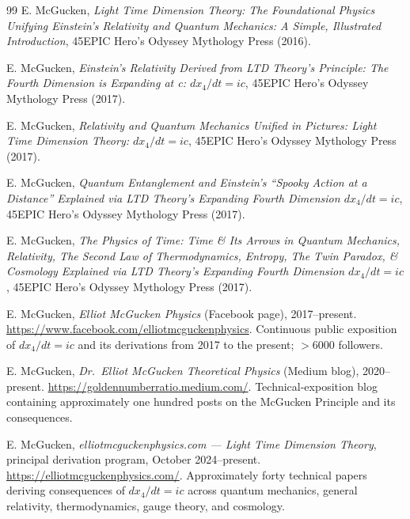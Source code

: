 \documentclass[11pt,a4paper]{article}
\begin{document}
\begin{thebibliography}{99}
 E. McGucken, \emph{Light Time Dimension Theory: The Foundational Physics Unifying Einstein's Relativity and Quantum Mechanics: A Simple, Illustrated Introduction}, 45EPIC Hero's Odyssey Mythology Press (2016).

 E. McGucken, \emph{Einstein's Relativity Derived from LTD Theory's Principle: The Fourth Dimension is Expanding at c: $dx_4/dt = ic$}, 45EPIC Hero's Odyssey Mythology Press (2017).

 E. McGucken, \emph{Relativity and Quantum Mechanics Unified in Pictures: Light Time Dimension Theory: $dx_4/dt = ic$}, 45EPIC Hero's Odyssey Mythology Press (2017).

 E. McGucken, \emph{Quantum Entanglement and Einstein's ``Spooky Action at a Distance'' Explained via LTD Theory's Expanding Fourth Dimension $dx_4/dt = ic$}, 45EPIC Hero's Odyssey Mythology Press (2017).

 E. McGucken, \emph{The Physics of Time: Time \& Its Arrows in Quantum Mechanics, Relativity, The Second Law of Thermodynamics, Entropy, The Twin Paradox, \& Cosmology Explained via LTD Theory's Expanding Fourth Dimension $dx_4/dt = ic$}, 45EPIC Hero's Odyssey Mythology Press (2017).

 E. McGucken, \emph{Elliot McGucken Physics} (Facebook page), 2017--present. \url{https://www.facebook.com/elliotmcguckenphysics}. Continuous public exposition of $dx_4/dt = ic$ and its derivations from 2017 to the present; $>6000$ followers.

 E. McGucken, \emph{Dr.\ Elliot McGucken Theoretical Physics} (Medium blog), 2020--present. \url{https://goldennumberratio.medium.com/}. Technical-exposition blog containing approximately one hundred posts on the McGucken Principle and its consequences.

 E. McGucken, \emph{elliotmcguckenphysics.com --- Light Time Dimension Theory}, principal derivation program, October 2024--present. \url{https://elliotmcguckenphysics.com/}. Approximately forty technical papers deriving consequences of $dx_4/dt = ic$ across quantum mechanics, general relativity, thermodynamics, gauge theory, and cosmology.

\end{thebibliography}
\end{document}
